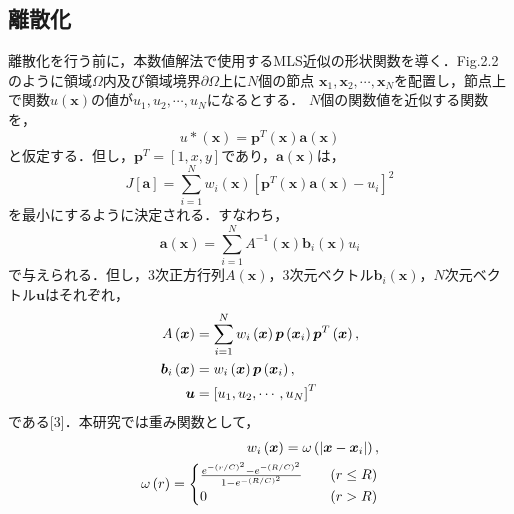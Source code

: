 \documentclass[twocolumn,head_space=15.0mm,foot_space=15.0mm,fleqn]{jlreq}
\numberwithin{equation}{section}
\begin{document}
\subsection{離散化}
離散化を行う前に，本数値解法で使用するMLS近似の形状関数を導く．Fig.2.2のように領域$\Omega$内及び領域境界$\partial \Omega$上に$N$個の節点
$\boldsymbol{x}_1, \boldsymbol{x}_2, \cdots, \boldsymbol{x}_N$を配置し，節点上で関数$u\left( \boldsymbol{x} \right)$の値が$u_1, u_2, \cdots, u_N$になるとする．
$N$個の関数値を近似する関数を，
\begin{equation}
	u* \left( \boldsymbol{x} \right) = \boldsymbol{p}^T \left( \boldsymbol{x} \right) \boldsymbol{a} \left( \boldsymbol{x} \right)
\end{equation}
と仮定する．但し，$\boldsymbol{p}^T = \left[ 1,x,y \right]$であり，$\boldsymbol{a} \left( \boldsymbol{x} \right)$は，
\begin{equation*}
	J \left[ \boldsymbol{a} \right] = \sum_{i=1}^N w_i \left( \boldsymbol{x} \right) 
	\left[ \boldsymbol{p}^T \left( \boldsymbol{x} \right) \boldsymbol{a} \left( \boldsymbol{x} \right) - u_i \right]^2
\end{equation*}
を最小にするように決定される．すなわち，
\begin{equation}
	\boldsymbol{a} \left( \boldsymbol{x} \right) = \sum_{i=1}^N A^{-1} \left( \boldsymbol{x} \right) \boldsymbol{b}_i \left( \boldsymbol{x} \right) u_i
\end{equation}
で与えられる．但し，3次正方行列$A\left( \boldsymbol{x} \right)$，3次元ベクトル$\boldsymbol{b}_i \left( \boldsymbol{x} \right)$，$N$次元ベクトル$\boldsymbol{u}$はそれぞれ，
\begin{align}
	A \left( \boldsymbol{x} \right) &= \sum_{i=1}^N w_i \left( \boldsymbol{x} \right) \boldsymbol{p} \left( \boldsymbol{x}_i \right) \boldsymbol{p}^T \left( \boldsymbol{x} \right), \\
	\boldsymbol{b}_i \left( \boldsymbol{x} \right) &= w_i \left( \boldsymbol{x} \right) \boldsymbol{p} \left( \boldsymbol{x}_i \right), \\
	\boldsymbol{u} &= \left[ u_1, u_2, \cdots, u_N \right]^T \notag
\end{align}
である[3]．本研究では重み関数として，
\begin{align}
	w_i \left( \boldsymbol{x} \right) = \omega \left( | \boldsymbol{x} - \boldsymbol{x}_i| \right), \\
	\omega \left( r \right) =
	\begin{cases}
		\frac{ e^{-(r / C)^2} - e^{-(R / C)^2} }{ 1 - e^{-(R / C)^2} } \quad & \left( r \le R \right) \\
		0 & \left( r > R \right)
	\end{cases} \notag
\end{align}
\end{document}
